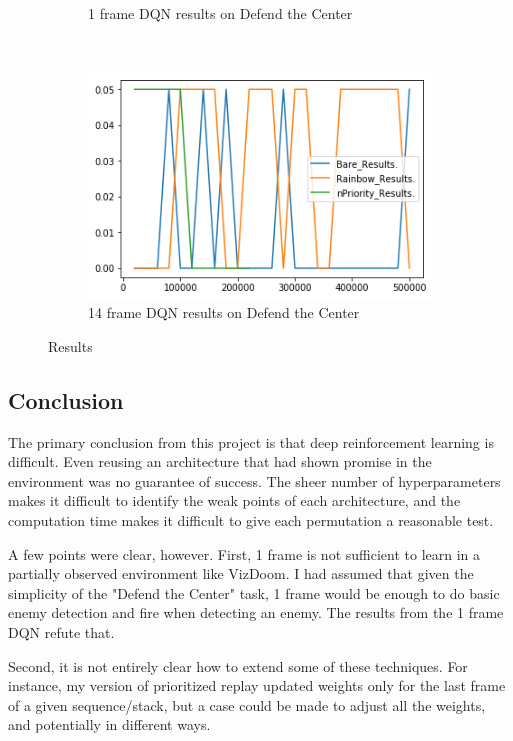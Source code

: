 \documentclass[letterpaper]{article}
\begin{document}
\begin{figure}
\begin{subfigure}[b]{0.3\textwidth}
			\caption{1 frame DQN results on Defend the Center}
			\label{fig:DQN1Results}
		\end{subfigure}
		~ %
		\begin{subfigure}[b]{0.3\textwidth}
			\includegraphics[width=\textwidth]{DQN4Results}
			\caption{14 frame DQN results on Defend the Center}
			\label{fig:DQN4Results}
		\end{subfigure}
		\caption{Results}\label{fig:Results}
	\end{figure}

	\subsection{Conclusion}
	
	The primary conclusion from this project is that deep reinforcement learning is difficult. Even reusing an architecture that had shown promise in the environment was no guarantee of success. The sheer number of hyperparameters makes it difficult to identify the weak points of each architecture, and the computation time makes it difficult to give each permutation a reasonable test.
	
	A few points were clear, however. First, 1 frame is not sufficient to learn in a partially observed environment like VizDoom. I had assumed that given the simplicity of the "Defend the Center" task, 1 frame would be enough to do basic enemy detection and fire when detecting an enemy. The results from the 1 frame DQN refute that.
	
	Second, it is not entirely clear how to extend some of these techniques. For instance, my version of prioritized replay updated weights only for the last frame of a given sequence/stack, but a case could be made to adjust all the weights, and potentially in different ways.
	
\end{document}
